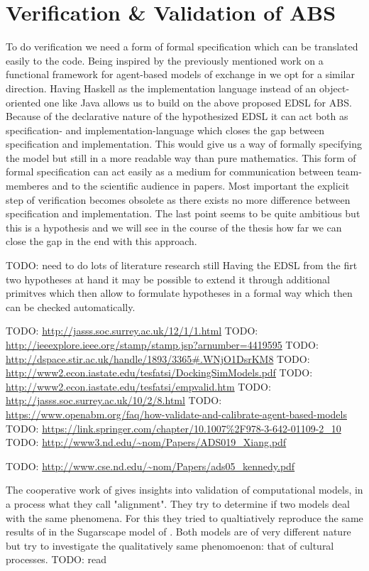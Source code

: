 \section{Verification \& Validation of ABS}
To do verification we need a form of formal specification which can be translated easily to the code. Being inspired by the previously mentioned work on a functional framework for agent-based models of exchange in \cite{botta_functional_2011} we opt for a similar direction. Having Haskell as the implementation language instead of an object-oriented one like Java allows us to build on the above proposed EDSL for ABS. Because of the declarative nature of the hypothesized EDSL it can act both as specification- and implementation-language which closes the gap between specification and implementation. This would give us a way of formally specifying the model but still in a more readable way than pure mathematics. This form of formal specification can act easily as a medium for communication between team-memberes and to the scientific audience in papers. Most important the explicit step of verification becomes obsolete as there exists no more difference between specification and implementation. The last point seems to be quite ambitious but this is a hypothesis and we will see in the course of the thesis how far we can close the gap in the end with this approach.

TODO: need to do lots of literature research still
Having the EDSL from the firt two hypotheses at hand it may be possible to extend it through additional primitves which then allow to formulate hypotheses in a formal way which then can be checked automatically.

TODO: \url{http://jasss.soc.surrey.ac.uk/12/1/1.html}
TODO: \url{http://ieeexplore.ieee.org/stamp/stamp.jsp?arnumber=4419595}
TODO: \url{http://dspace.stir.ac.uk/handle/1893/3365#.WNjO1DsrKM8}
TODO: \url{http://www2.econ.iastate.edu/tesfatsi/DockingSimModels.pdf}
TODO: \url{http://www2.econ.iastate.edu/tesfatsi/empvalid.htm}
TODO: \url{http://jasss.soc.surrey.ac.uk/10/2/8.html}
TODO: \url{https://www.openabm.org/faq/how-validate-and-calibrate-agent-based-models}
TODO: \url{https://link.springer.com/chapter/10.1007%2F978-3-642-01109-2_10}
TODO: \url{http://www3.nd.edu/~nom/Papers/ADS019_Xiang.pdf}

TODO: \url{http://www.cse.nd.edu/~nom/Papers/ads05_kennedy.pdf}

The cooperative work of \cite{axtell_aligning_1996} gives insights into validation of computational models, in a process what they call "alignment". They try to determine if two models deal with the same phenomena. For this they tried to qualtiatively reproduce the same results of \cite{axelrod_convergence_1995} in the Sugarscape model of \cite{epstein_growing_1996}. Both models are of very different nature but try to investigate the qualitatively same phenomoenon: that of cultural processes. TODO: read

